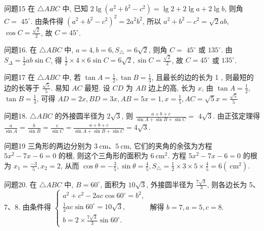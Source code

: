 问题15 在 $\triangle A B C$ 中, 已知 $2 \lg \left(a^2+b^2-c^2\right)=\lg 2+2 \lg a+2 \lg b$, 则角 $C=$
$45^{\circ}$. 由条件得 $\left(a^2+b^2-c^2\right)^2=2 a^2 b^2$, 所以 $a^2+b^2-c^2=\sqrt{2} a b$, $\cos C=\frac{\sqrt{2}}{2}$, 故 $C=45^{\circ}$.



问题16. 在 $\triangle A B C$ 中, $a=4, b=6, S_{\triangle}=6 \sqrt{2}$, 则角 $C=$
$45^{\circ}$ 或 $135^{\circ}$. 由 $S_{\Delta}=\frac{1}{2} a b \sin C$, 得 $\frac{1}{2} \times 4 \times 6 \sin C=6 \sqrt{2}, \sin C=\frac{\sqrt{2}}{2}$, 故 $C=45^{\circ}$ 或 $135^{\circ}$.



问题17 在 $\triangle A B C$ 中, 若 $\tan A=\frac{1}{2}, \tan B=\frac{1}{3}$, 且最长的边的长为 1 , 则最短的边的长等于
$\frac{\sqrt{5}}{5}$. 易知 $A C$ 最短.
设 $C D$ 为 $A B$ 边上的高, 长为 $x$, 由 $\tan A=\frac{1}{2}$, $\tan B=\frac{1}{3}$, 可得 $A D=2 x, B D=3 x, A B=5 x=1, x=\frac{1}{5}, A C=\sqrt{5} x=\frac{\sqrt{5}}{5}$



问题18. $\triangle A B C$ 的外接圆半径为 $2 \sqrt{3}$, 则 $\frac{a+b+c}{\sin A+\sin B+\sin C}=$
$4 \sqrt{3}$. 由正弦定理得 $\frac{a}{\sin A}=\frac{b}{\sin B}=\frac{c}{\sin C}=\frac{a+b+c}{\sin A+\sin B+\sin C}= 4 \sqrt{3}$.



问题19 三角形的两边分别为 $3 \mathrm{~cm} 、 5 \mathrm{~cm}$, 它们的夹角的余弦为方程 $5 x^2-7 x- 6=0$ 的根, 则这个三角形的面积为
$6 \mathrm{~cm}^2$. 方程 $5 x^2-7 x-6=0$ 的根为 $x_1=\frac{-3}{5}, x_2=2$, 从而 $\cos \theta= -\frac{3}{5}, \sin \theta=\frac{4}{5}, S_{\triangle}=\frac{1}{2} \times 3 \times 5 \times \frac{4}{5}=6\left(\mathrm{~cm}^2\right)$.



问题20. 在 $\triangle A B C$ 中, $B=60^{\circ}$, 面积为 $10 \sqrt{3}$, 外接圆半径为 $\frac{7 \sqrt{3}}{3}$, 则各边长为
5、7、8. 由条件得 $\left\{\begin{array}{l}a^2+c^2-2 a c \cos 60^{\circ}=b^2, \\ \frac{1}{2} a c \sin 60^{\circ}=10 \sqrt{3}, \\ b=2 \times \frac{7 \sqrt{3}}{3} \sin 60^{\circ} .\end{array}\right.$ 解得 $b=7, a=5, c=8$.



